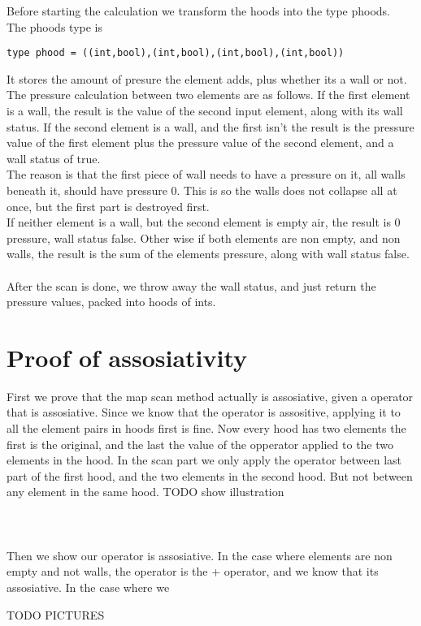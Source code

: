 \documentclass[11pt]{report}
\begin{document}
Before starting the calculation we transform the hoods into the type phoods.
\\
The phoods type is
\begin{lstlisting}
type phood = ((int,bool),(int,bool),(int,bool),(int,bool))
\end{lstlisting}
It stores the amount of presure the element adds, plus whether its a wall or not. The pressure calculation between two elements are as follows. If the first element is a wall, the result is the value of the second input element, along with its wall status. If the second element is a wall, and the first isn't the result is the pressure value of the first element plus the pressure value of the second element, and a wall status of true.
\\
The reason is that the first piece of wall needs to have a pressure on it, all walls beneath it, should have pressure 0. This is so the walls does not collapse all at once, but the first part is destroyed first.
\\
If neither element is a wall, but the second element is empty air, the result is 0 pressure, wall status false. Other wise if both elements are non empty, and non walls, the result is the sum of the elements pressure, along with wall status false.
\\
\\
After the scan is done, we throw away the wall status, and just return the pressure values, packed into hoods of ints.



\section{Proof of assosiativity}


First we prove that the map scan method actually is assosiative, given a operator that is assosiative. Since we know that the operator is assositive, applying it to all the element pairs in hoods first is fine. Now every hood has two elements the first is the original, and the last the value of the opperator applied to the two elements in the hood. In the scan part we only apply the operator between last part of the first hood, and the two elements in the second hood. But not between any element in the same hood. TODO show illustration
\\
\\


\\
\\
Then we show our operator is assosiative. In the case where elements are non empty and not walls, the operator is the + operator, and we know that its assosiative.
In the case where we



TODO PICTURES
\end{document}
